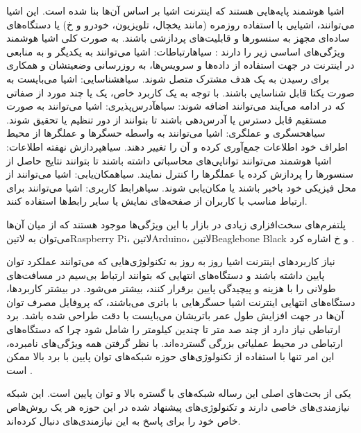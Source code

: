 اشیا هوشمند پایه‌هایی هستند که اینترنت اشیا بر اساس آن‌ها بنا شده است. این اشیا می‌توانند، اشیایی با استفاده روزمره (مانند یخچال، تلویزیون، خودرو و ‌خ) یا دستگاه‌های ساده‌ای مجهز به
سنسورها و قابلیت‌های پردازشی باشند. به صورت کلی اشیا هوشمند ویژگی‌های اساسی زیر را دارند
:
 ‌سیاه{ارتباطات}: اشیا می‌توانند به یکدیگر و به منابعی در اینترنت در جهت استفاده از داده‌ها و سرویس‌ها، به روزرسانی وضعیتشان و همکاری برای رسیدن به یک هدف مشترک متصل شوند.
 ‌سیاه{شناسایی}: اشیا می‌بایست به صورت یکتا قابل شناسایی باشند.
با توجه به یک کاربرد خاص، یک یا چند مورد از صفاتی که در ادامه می‌آیند می‌توانند اضافه شوند:
 ‌سیاه{آدرس‌پذیری}: اشیا می‌توانند به صورت مستقیم قابل دسترس یا آدرس‌دهی باشند تا بتوانند از دور تنظیم یا تحقیق شوند.
 ‌سیاه{حسگری و عملگری}: اشیا می‌توانند به واسطه حسگرها و عملگرها از محیط اطراف خود اطلاعات جمع‌آوری کرده و آن را تغییر دهند.
 ‌سیاه{پردازش نهفته اطلاعات}: اشیا هوشمند می‌توانند توانایی‌های محاسباتی داشته باشند تا بتوانند نتایج حاصل از سنسورها را پردازش کرده یا عملگرها را کنترل نمایند.
 ‌سیاه{مکان‌یابی}: اشیا می‌توانند از محل فیزیکی خود باخبر باشند یا مکان‌یابی شوند.
 ‌سیاه{رابط کاربری}: اشیا می‌توانند برای ارتباط مناسب با کاربران از صفحه‌های نمایش یا سایر رابط‌ها استفاده کنند.

پلتفرم‌های سخت‌افزاری زیادی در بازار با این ویژگی‌ها موجود هستند که از میان آن‌ها می‌توان به ‌لاتین{Raspberry Pi}، ‌لاتین{Arduino}، ‌لاتین{Beaglebone Black} و ‌خ اشاره کرد
.


نیاز کاربردهای اینترنت اشیا روز به روز به تکنولوژی‌هایی که می‌توانند عملکرد توان پایین داشته باشند
و دستگاه‌های انتهایی که بتوانند ارتباط بی‌سیم در مسافت‌های طولانی را با هزینه و پیچیدگی پایین برقرار کنند، بیشتر می‌شود.
در بیشتر کاربردها، دستگاه‌های انتهایی اینترنت اشیا حسگرهایی با باتری می‌باشند، که پروفایل مصرف توان آن‌ها در جهت افزایش طول عمر
باتریشان می‌بایست با دقت طراحی شده باشد.
برد ارتباطی نیاز دارد از چند صد متر تا چندین کیلومتر را شامل شود چرا که دستگاه‌های ارتباطی در محیط عملیاتی بزرگی گسترده‌اند.
با نظر گرفتن همه ویژگی‌های نامبرده، این امر تنها با استفاده از تکنولوژی‌های حوزه شبکه‌های توان پایین با برد بالا ممکن است
.


یکی از بحث‌های اصلی این رساله شبکه‌های با گستره بالا و توان پایین است. این شبکه نیازمندی‌های خاصی دارند و تکنولوژی‌های پیشنهاد شده در این حوزه
هر یک روش‌هاص خاص خود را برای پاسخ به این نیازمندی‌های دنبال کرده‌اند.

